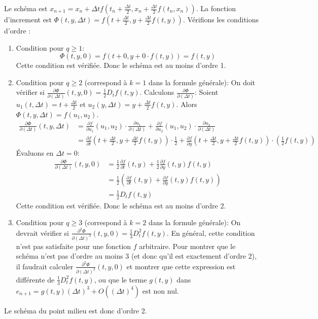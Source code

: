 \begin{example}
Le schéma est $x_{n+1} = x_n + \Delta t f(t_n + \frac{\Delta t}{2}, x_n + \frac{\Delta t}{2} f(t_n, x_n))$.
La fonction d'increment est $\Phi(t,y, \Delta t) = f\left(t + \frac{\Delta t}{2}, y + \frac{\Delta t}{2} f(t,y)\right)$.
Vérifions les conditions d'ordre :
\begin{enumerate}
    \item Condition pour $q \ge 1$:
    \[
    \Phi(t,y,0) = f\left(t + 0, y + 0 \cdot f(t,y)\right) = f(t,y)
    \]
    Cette condition est vérifiée. Donc le schéma est au moins d'ordre 1.

    \item Condition pour $q \ge 2$ (correspond à $k=1$ dans la formule générale):
    On doit vérifier si $\displaystyle \frac{\partial \Phi}{\partial (\Delta t)}(t,y,0) = \frac{1}{2} D_t f(t,y)$.
    Calculons $\displaystyle \frac{\partial \Phi}{\partial (\Delta t)}$:
    Soient $u_1(t, \Delta t) = t + \frac{\Delta t}{2}$ et $u_2(y, \Delta t) = y + \frac{\Delta t}{2} f(t,y)$.
    Alors $\Phi(t,y, \Delta t) = f(u_1, u_2)$.
    \begin{align*}
    \frac{\partial \Phi}{\partial (\Delta t)}(t,y, \Delta t) &= \frac{\partial f}{\partial u_1}(u_1, u_2) \cdot \frac{\partial u_1}{\partial (\Delta t)} + \frac{\partial f}{\partial u_2}(u_1, u_2) \cdot \frac{\partial u_2}{\partial (\Delta t)} \\
    &= \frac{\partial f}{\partial t}\left(t + \frac{\Delta t}{2}, y + \frac{\Delta t}{2}f(t,y)\right) \cdot \frac{1}{2} + \frac{\partial f}{\partial y}\left(t + \frac{\Delta t}{2}, y + \frac{\Delta t}{2}f(t,y)\right) \cdot \left( \frac{1}{2} f(t,y) \right)
    \end{align*}
    Évaluons en $\Delta t = 0$:
    \begin{align*}
    \frac{\partial \Phi}{\partial (\Delta t)}(t,y,0) &= \frac{1}{2} \frac{\partial f}{\partial t}(t,y) + \frac{1}{2} \frac{\partial f}{\partial y}(t,y) f(t,y) \\
    &= \frac{1}{2} \left( \frac{\partial f}{\partial t}(t,y) + \frac{\partial f}{\partial y}(t,y) f(t,y) \right) \\
    &= \frac{1}{2} D_t f(t,y)
    \end{align*}
    Cette condition est vérifiée. Donc le schéma est au moins d'ordre 2.

    \item Condition pour $q \ge 3$ (correspond à $k=2$ dans la formule générale):
    On devrait vérifier si $\displaystyle \frac{\partial^2 \Phi}{\partial (\Delta t)^2}(t,y,0) = \frac{1}{3} D_t^2 f(t,y)$.
    En général, cette condition n'est pas satisfaite pour une fonction $f$ arbitraire. Pour montrer que le schéma n'est pas d'ordre au moins 3 (et donc qu'il est exactement d'ordre 2), il faudrait calculer $\frac{\partial^2 \Phi}{\partial (\Delta t)^2}(t,y,0)$ et montrer que cette expression est différente de $\frac{1}{3} D_t^2 f(t,y)$, ou que le terme $g(t,y)$ dans $e_{n+1} = g(t,y)(\Delta t)^3 + O((\Delta t)^4)$ est non nul.
\end{enumerate}
Le schéma du point milieu est donc d'ordre 2.
\end{example}

